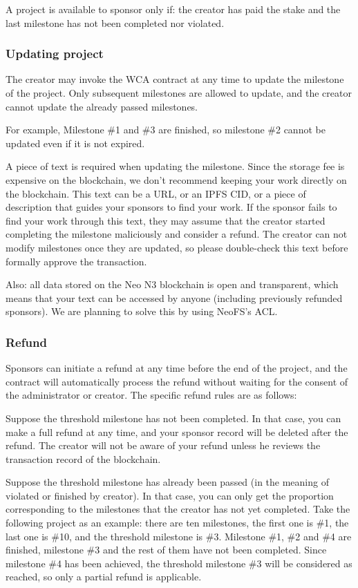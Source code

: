 A project is available to sponsor only if: the creator has paid the stake
and the last milestone has not been completed nor violated.

\subsubsection{Updating project}

The creator may invoke the WCA contract at any time to update the milestone
of the project.
Only subsequent milestones are allowed to update, and the creator cannot
update the already passed milestones.

For example, Milestone \#1 and \#3 are finished, so milestone \#2 cannot be
updated even if it is not expired.

A piece of text is required when updating the milestone.
Since the storage fee is expensive on the blockchain, we don't recommend keeping
your work directly on the blockchain.
This text can be a URL, or an IPFS CID, or a piece of description that guides
your sponsors to find your work.
If the sponsor fails to find your work through this text, they may assume that
the creator started completing the milestone maliciously and consider a refund.
The creator can not modify milestones once they are updated, so please
double-check this text before formally approve the transaction.

Also: all data stored on the Neo N3 blockchain is open and transparent, which
means that your text can be accessed by anyone (including previously refunded
sponsors).
We are planning to solve this by using NeoFS's ACL\@.

\subsubsection{Refund}

Sponsors can initiate a refund at any time before the end of the project,
and the contract will automatically process the refund without waiting for
the consent of the administrator or creator.
The specific refund rules are as follows:

Suppose the threshold milestone has not been completed.
In that case, you can make a full refund at any time, and your sponsor record
will be deleted after the refund.
The creator will not be aware of your refund unless he reviews the transaction
record of the blockchain.

Suppose the threshold milestone has already been passed (in the meaning of
violated or finished by creator).
In that case, you can only get the proportion corresponding to the milestones
that the creator has not yet completed.
Take the following project as an example: there are ten milestones, the first
one is \#1, the last one is \#10, and the threshold milestone is \#3.
Milestone \#1, \#2 and \#4 are finished, milestone \#3 and the rest of them
have not been completed.
Since milestone \#4 has been achieved, the threshold milestone \#3 will be
considered as reached, so only a partial refund is applicable.


